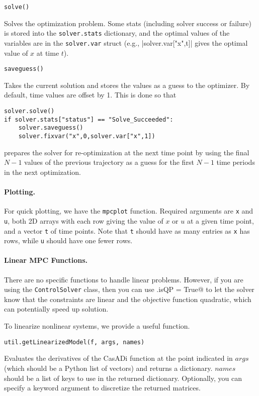 \documentclass{article}
\providecommand{\lstinline}{}
\newcommand{\funcname}[2][.25em]{\vspace{#1}\noindent\texttt{#2}\nopagebreak\vspace{#1}}
\newcommand{\casadi}{CasADi}
\begin{document}
\begin{multicols}{2}
\funcname{solve()}

Solves the optimization problem.
Some stats (including solver success or failure) is stored into the \texttt{solver.stats} dictionary, and the optimal values of the variables are in the \texttt{solver.var} struct (e.g., \lstinline|solver.var["x",t]| gives the optimal value of $x$ at time $t$).

\funcname{saveguess()}

Takes the current solution and stores the values as a guess to the optimizer.
By default, time values are offset by 1. This is done so that
%
\begin{lstlisting}[frame=L]
solver.solve()
if solver.stats["status"] == "Solve_Succeeded":
    solver.saveguess()
    solver.fixvar("x",0,solver.var["x",1])
\end{lstlisting}
%
prepares the solver for re-optimization at the next time point by using the final $N-1$ values of the previous trajectory as a guess for the first $N-1$ time periods in the next optimization.

\paragraph{Plotting.}

For quick plotting, we have the \texttt{mpcplot} function.
Required arguments are \texttt{x} and \texttt{u}, both 2D arrays with each row giving the value of $x$ or $u$ at a given time point, and a vector \texttt{t} of time points.
Note that \texttt{t} should have as many entries as \texttt{x} has rows, while \texttt{u} should have one fewer rows.

\paragraph*{Linear MPC Functions.}

There are no specific functions to handle linear problems.
However, if you are using the \texttt{ControlSolver} class, then you can use \lstinline@solver.isQP = True@ to let the solver know that the constraints are linear and the objective function quadratic, which can potentially speed up solution.

To linearize nonlinear systems, we provide a useful function.

\funcname{util.getLinearizedModel(f, args, names)}

Evaluates the derivatives of the \casadi{} function \lstinline@f@ at the point indicated in \lstinline$args$ (which should be a Python list of vectors) and returns a dictionary.
\lstinline$names$ should be a list of keys to use in the returned dictionary.
Optionally, you can specify a \lstinline@Delta@ keyword argument to discretize the returned matrices.


\end{multicols}
\end{document}
